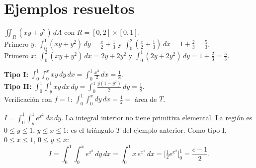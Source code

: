 \documentclass[11pt,a4paper]{article}
\newcommand{\dA}{\,dA}
\begin{document}
\section{Ejemplos resueltos}

\begin{ejemplo}
$\iint_R(xy+y^2)\dA$ con $R=[0,2]\times[0,1]$.\\
Primero $y$: $\int_0^1(xy+y^2)\,dy=\tfrac x2+\tfrac13$ y $\int_0^2(\tfrac x2+\tfrac13)\,dx=1+\tfrac23=\tfrac53$.\\
Primero $x$: $\int_0^2(xy+y^2)\,dx=2y+2y^2$ y $\int_0^1(2y+2y^2)\,dy=1+\tfrac23=\tfrac53$. \checkmark
\end{ejemplo}

\begin{ejemplo}[Ejemplo 2 (Clase 18). Triángulo $T=\{0\le y\le x\le1\}$]
\begin{minipage}{0.68\textwidth}
\textbf{Tipo I:} $\displaystyle\int_0^1\!\!\int_0^x xy\,dy\,dx=\int_0^1\frac{x^3}{2}\,dx=\frac18$.\\[3pt]
\textbf{Tipo II:} $\displaystyle\int_0^1\!\!\int_y^1 xy\,dx\,dy=\int_0^1\frac{y(1-y^2)}2\,dy=\frac18$.\\[3pt]
Verificación con $f=1$: $\int_0^1\int_0^x dy\,dx=\tfrac12=$ área de $T$.
\end{minipage}\hfill
\begin{minipage}{0.28\textwidth}
\centering
{}
\end{minipage}
\end{ejemplo}

\begin{ejemplo}
$I=\displaystyle\int_0^1\!\!\int_y^1 e^{x^2}\,dx\,dy$. La integral interior no tiene primitiva elemental.
La región es $0\le y\le1$, $y\le x\le1$: es el triángulo $T$ del ejemplo anterior. Como tipo I, $0\le x\le1$, $0\le y\le x$:
\[
I=\int_0^1\!\!\int_0^x e^{x^2}\,dy\,dx=\int_0^1 x\,e^{x^2}\,dx=\Big[\tfrac12e^{x^2}\Big]_0^1=\frac{e-1}2 .
\]
\end{ejemplo}
\end{document}
